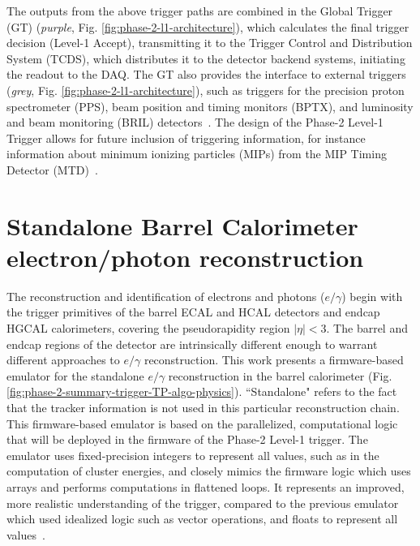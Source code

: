 The outputs from the above trigger paths are combined in the Global Trigger (GT) (\textit{purple}, Fig. \ref{fig:phase-2-l1-architecture}), which calculates the final trigger decision (Level-1 Accept), transmitting it to the Trigger Control and Distribution System (TCDS), which distributes it to the detector backend systems, initiating the readout to the DAQ. The GT also provides the interface to external triggers (\textit{grey}, Fig. \ref{fig:phase-2-l1-architecture}), such as triggers for the precision proton spectrometer (PPS), beam position and timing monitors (BPTX), and luminosity and beam monitoring (BRIL) detectors~\cite{CMS-TDR-021}. The design of the Phase-2 Level-1 Trigger allows for future inclusion of triggering information, for instance information about minimum ionizing particles (MIPs) from the MIP Timing Detector (MTD)~\cite{CERN-LHCC-2017-027}.

\section{Standalone Barrel Calorimeter electron/photon reconstruction}
\label{section:standalone_barrel_calo_egamma}
The reconstruction and identification of electrons and photons ($e/\gamma$) begin with the trigger primitives of the barrel ECAL and HCAL detectors and endcap HGCAL calorimeters, covering the pseudorapidity region $|\eta| < 3$. The barrel and endcap regions of the detector are intrinsically different enough to warrant different approaches to $e/\gamma$ reconstruction. This work presents a firmware-based emulator for the standalone $e/\gamma$ reconstruction in the barrel calorimeter (Fig. \ref{fig:phase-2-summary-trigger-TP-algo-physics}). ``Standalone" refers to the fact that the tracker information is not used in this particular reconstruction chain. This firmware-based emulator is based on the parallelized, computational logic that will be deployed in the firmware of the Phase-2 Level-1 trigger. The emulator uses fixed-precision integers to represent all values, such as in the computation of cluster energies, and closely mimics the firmware logic which uses arrays and performs computations in flattened loops. It represents an improved, more realistic understanding of the trigger, compared to the previous emulator which used idealized logic such as vector operations, and floats to represent all values~\cite{CMS-TDR-021}.


